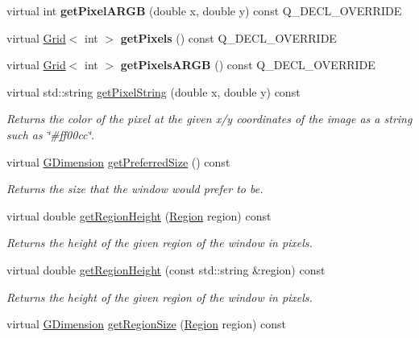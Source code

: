\begin{DoxyCompactItemize}
\item 
virtual int {\bfseries get\+Pixel\+A\+R\+GB} (double x, double y) const Q\+\_\+\+D\+E\+C\+L\+\_\+\+O\+V\+E\+R\+R\+I\+DE
\item 
virtual \mbox{\hyperlink{classGrid}{Grid}}$<$ int $>$ {\bfseries get\+Pixels} () const Q\+\_\+\+D\+E\+C\+L\+\_\+\+O\+V\+E\+R\+R\+I\+DE
\item 
virtual \mbox{\hyperlink{classGrid}{Grid}}$<$ int $>$ {\bfseries get\+Pixels\+A\+R\+GB} () const Q\+\_\+\+D\+E\+C\+L\+\_\+\+O\+V\+E\+R\+R\+I\+DE
\item 
virtual std\+::string \mbox{\hyperlink{classGDrawingSurface_a8da04ef488ec5fa498fbbffaf50928fd}{get\+Pixel\+String}} (double x, double y) const
\begin{DoxyCompactList}\small\item\em Returns the color of the pixel at the given x/y coordinates of the image as a string such as \char`\"{}\#ff00cc\char`\"{}. \end{DoxyCompactList}\item 
virtual \mbox{\hyperlink{classGDimension}{G\+Dimension}} \mbox{\hyperlink{classGWindow_a4aabbee761d8e9116275401131b7ccd1}{get\+Preferred\+Size}} () const
\begin{DoxyCompactList}\small\item\em Returns the size that the window would prefer to be. \end{DoxyCompactList}\item 
virtual double \mbox{\hyperlink{classGWindow_a164d248057318961e7f2abc8c3477d63}{get\+Region\+Height}} (\mbox{\hyperlink{classGWindow_a81a01a86de31071a92e6cce0bab9bc4b}{Region}} region) const
\begin{DoxyCompactList}\small\item\em Returns the height of the given region of the window in pixels. \end{DoxyCompactList}\item 
virtual double \mbox{\hyperlink{classGWindow_ae8a545e772745b89edaf9804a2dc0057}{get\+Region\+Height}} (const std\+::string \&region) const
\begin{DoxyCompactList}\small\item\em Returns the height of the given region of the window in pixels. \end{DoxyCompactList}\item 
virtual \mbox{\hyperlink{classGDimension}{G\+Dimension}} \mbox{\hyperlink{classGWindow_a3b5db9ffbd4b32260f80634f162dba4e}{get\+Region\+Size}} (\mbox{\hyperlink{classGWindow_a81a01a86de31071a92e6cce0bab9bc4b}{Region}} region) const

\end{DoxyCompactItemize}
